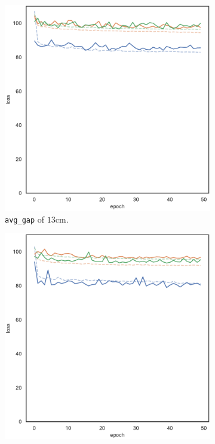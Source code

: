 \begin{figure}[!htb]
\begin{center}
\begin{subfigure}[h]{0.32\textwidth}
			\includegraphics[width=\textwidth]{contents/images/task1-comm-extension/loss-distributed-gap_20@copy}%
			\caption{\texttt{avg\_gap} of $13$\gls{cm}.}
		\end{subfigure}
		\hfill
		\begin{subfigure}[h]{0.32\textwidth}
			\includegraphics[width=\textwidth]{contents/images/task1-comm-extension/loss-distributed-gap_var@copy}

\end{subfigure}
\end{center}
\end{figure}
